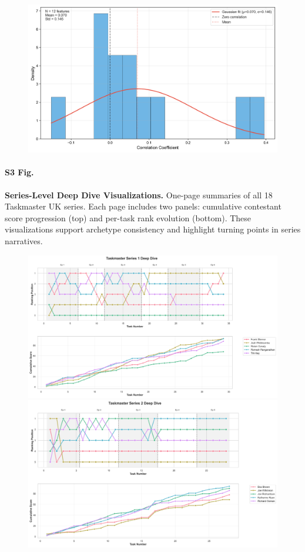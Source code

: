 \documentclass[10pt,letterpaper]{article}
\begin{document}
\begin{figure}[!h]
\centering
\includegraphics[width=\linewidth]{supfigure/figure8b_raw_correlations.png}
\end{figure}
\FloatBarrier

\paragraph*{S3 Fig.}
\label{S3_Fig}
{\bf Series-Level Deep Dive Visualizations.}
One-page summaries of all 18 Taskmaster UK series. Each page includes two panels: cumulative contestant score progression (top) and per-task rank evolution (bottom). These visualizations support archetype consistency and highlight turning points in series narratives.

\begin{figure}[!h]
\centering
\includegraphics[width=\linewidth]{supfigure/series_1_deep_dive.png}
\includegraphics[width=\linewidth]{supfigure/series_2_deep_dive.png}
\end{figure}
\FloatBarrier
\clearpage
\end{document}
